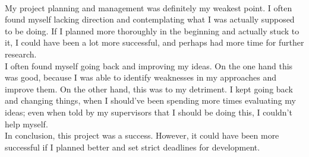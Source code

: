 \begin{appendices}
\\ My project planning and management was definitely my weakest point. I often found myself lacking direction and contemplating what I was actually supposed to be doing. If I planned more thoroughly in the beginning and actually stuck to it, I could have been a lot more successful, and perhaps had more time for further research.
\\ I often found myself going back and improving my ideas. On the one hand this was good, because I was able to identify weaknesses in my approaches and improve them. On the other hand, this was to my detriment. I kept going back and changing things, when I should've been spending more times evaluating my ideas; even when told by my supervisors that I should be doing this, I couldn't help myself.
\\In conclusion, this project was a success. However, it could have been more successful if I planned better and set strict deadlines for development.







    


\end{appendices}
